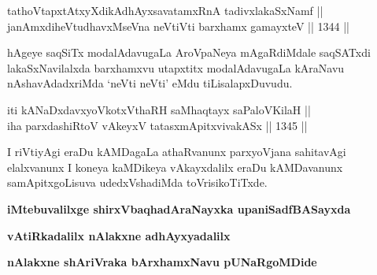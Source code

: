 \begin{shl}
tathoVtapxtAtxyXdikAdhAyxsavatamxRnA tadivxlakaSxNamf || \\
janAmxdiheVtudhavxMseVna neVtiVti barxhamx gamayxteV \hfill || 1344 ||  
\end{shl}

\begin{artha}
hAgeye saqSiTx modalAdavugaLa AroVpaNeya mAgaRdiMdale saqSATxdi lakaSxNavilalxda barxhamxvu utapxtitx modalAdavugaLa kAraNavu nAshavAdadxriMda `neVti neVti' eMdu tiLisalapxDuvudu.
\end{artha}


\begin{shl}
iti kANaDxdavxyoVkotxV\s thaRH saMhaqtayx saPaloV\s KilaH || \\
iha parxdashiRtoV vAkeyxV tatasxmApitxvivakASx \hfill || 1345 ||  
\end{shl}

\begin{artha}
I riVtiyAgi eraDu kAMDagaLa athaRvanunx parxyoVjana sahitavAgi elalxvanunx I koneya kaMDikeya vAkayxdalilx eraDu kAMDavanunx samApitxgoLisuva udedxVshadiMda toVrisikoTiTxde.
\end{artha}

\bigskip
\begin{center}
{\bf iMtebuvalilxge shirxVbaqhadAraNayxka upaniSadfBASayxda}

\smallskip
{\bf vAtiRkadalilx nAlakxne adhAyxyadalilx}

\smallskip
{\bf nAlakxne shAriVraka bArxhamxNavu pUNaRgoMDide}
\end{center}
\bigskip
